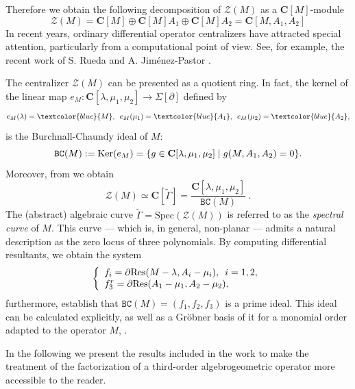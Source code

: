 \documentclass[a4paper,12pt]{article}
\newcommand{\cZ}{\mathcal{Z}}
\newcommand{\Spec}{\textrm{Spec}}
\newcommand{\coC}{\mathbf{C}}
\def\dres{\partial{\rm Res}}
\def\Ker{\rm Ker}
\def\BC{\texttt{BC}}
\def\Ker{{\rm Ker}}
\def\eM{e_{M}}
\begin{document}
Therefore we obtain the following decomposition of $\cZ(M) $ as a $\coC [M]$-module 
\begin{equation}\label{eq-cen_mod}
\cZ(M)    =\coC[M]\oplus \coC[M]A_1\oplus \coC[M]A_2=\coC[M,A_1,A_2] 
\end{equation}
In recent years, ordinary differential operator centralizers have attracted special attention, particularly from a computational point of view. See, for example, the recent work of S. Rueda and A. Jiménez-Pastor \cite{JPR2026-BCideals, rueda2026classification}.




The centralizer $\cZ(M) $ can be presented as a quotient ring. In fact, the kernel of the linear map\;  $\eM: \coC [\lambda,\mu_1, \mu_2] \rightarrow \Sigma[\partial]$ defined by 
\[
\eM(\lambda)=\textcolor{blue}{M},\,\,\,  \eM(\mu_1)=\textcolor{blue}{A_1 },\,\,\, \eM(\mu_2)=\textcolor{blue}{A_2 },
\]
is the Burchnall-Chaundy ideal of $M$:
\begin{equation*}\label{def-BCL}
{\BC (M):=\Ker(\eM)=\{g\in\coC [\lambda,\mu_1, \mu_2]\mid g(M,A_1,A_2)=0\}.    }
\end{equation*}
Moreover, from \cite{RZ2024} we obtain
\begin{equation*}\label{eq-isomorfismo}
    \cZ(M)  \simeq \coC[\widetilde{\Gamma}]=\frac{\coC [\lambda, \mu_1 ,\mu_2]}{\BC(M)} \ .
\end{equation*}
The (abstract) algebraic curve $\widetilde{\Gamma} =\Spec (\cZ(M))$ is referred to as the {\it spectral curve} of $M$. This curve — which is, in general, non-planar — admits a natural description as the zero locus of three polynomials. By computing differential resultants, we obtain the system
    $$\left\{\begin{array}{l}
     f_i=\dres(M-\lambda,A_i-\mu_i),\,\,\,i=1,2,\\
     f_3^r=\dres(A_1-\mu_1,A_2-\mu_2),
\end{array}\right.$$
 furthermore, establish that  $\BC(M)=(f_1,f_2,f_3)$ is a prime ideal. This ideal can be calculated explicitly, as well as a Gröbner basis of it for a monomial order adapted to the operator $M$, \cite{JPR2026-BCideals}.

 

\bigskip


\medskip
In the following we present the results included in the work \cite{RZ2024} to make the treatment of the factorization of a third-order algebrogeometric operator more accessible to the reader.
\end{document}
